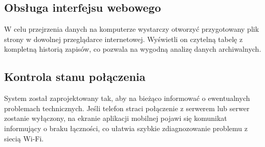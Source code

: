 \subsection{Obsługa interfejsu webowego}
W celu przejrzenia danych na komputerze wystarczy otworzyć przygotowany plik strony w dowolnej przeglądarce internetowej. Wyświetli on czytelną tabelę z kompletną historią zapisów, co pozwala na wygodną analizę danych archiwalnych.

\subsection{Kontrola stanu połączenia}
System został zaprojektowany tak, aby na bieżąco informować o ewentualnych problemach technicznych. Jeśli telefon straci połączenie z serwerem lub serwer zostanie wyłączony, na ekranie aplikacji mobilnej pojawi się komunikat informujący o braku łączności, co ułatwia szybkie zdiagnozowanie problemu z siecią Wi-Fi.